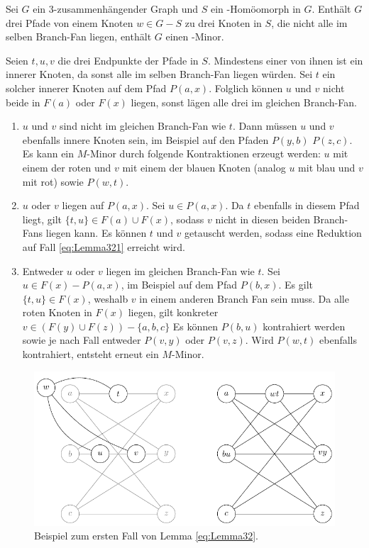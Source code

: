\begin{lemma}\label{eq:Lemma32}
  Sei $G$ ein $3$-zusammenhängender Graph und $S$ ein \kdd-Homöomorph in $G$.
  Enthält $G$ drei Pfade von einem Knoten $w \in G - S$ zu drei Knoten in $S$, die nicht alle im selben Branch-Fan liegen, enthält $G$ einen \kf-Minor.
\end{lemma}
\begin{beweis}
  Seien $t, u, v$ die drei Endpunkte der Pfade in $S$.
  Mindestens einer von ihnen ist ein innerer Knoten, da sonst alle im selben Branch-Fan liegen würden.
  Sei \oBdA $t$ ein solcher innerer Knoten auf dem Pfad $P(a, x)$.
  Folglich können $u$ und $v$ nicht beide in $F(a)$ oder $F(x)$ liegen, sonst lägen alle drei im gleichen Branch-Fan.
  \begin{enumerate}
    \item $u$ und $v$ sind nicht im gleichen Branch-Fan wie $t$. \label{eq:Lemma321}
          Dann müssen $u$ und $v$ ebenfalls innere Knoten sein, im Beispiel auf den Pfaden $P(y, b)$ \bzw $P(z, c)$.
          Es kann ein $M$-Minor durch folgende Kontraktionen erzeugt werden: $u$ mit einem der roten und $v$ mit einem der blauen Knoten (analog $u$ mit blau und $v$ mit rot) sowie $P(w, t)$.
    \item $u$ oder $v$ liegen auf $P(a, x)$. \label{eq:Lemma322}
          Sei \oBdA $u \in P(a, x)$.
          Da $t$ ebenfalls in diesem Pfad liegt, gilt $\{t, u\} \in F(a) \cup F(x)$, sodass $v$ nicht in diesen beiden Branch-Fans liegen kann.
          Es können $t$ und $v$ getauscht werden, sodass eine Reduktion auf Fall \ref{eq:Lemma321} erreicht wird.
    \item Entweder $u$ oder $v$ liegen im gleichen Branch-Fan wie $t$. \label{eq:Lemma323}
          Sei \oBdA $u \in F(x) - P(a, x)$, im Beispiel auf dem Pfad $P(b, x)$.
          Es gilt $\{t, u\} \in F(x)$, weshalb $v$ in einem anderen Branch Fan sein muss.
          Da alle roten Knoten in $F(x)$ liegen, gilt konkreter $v \in (F(y) \cup F(z)) - \{a, b, c\}$
          Es können $P(b, u)$ kontrahiert werden sowie je nach Fall entweder $P(v, y)$ oder $P(v, z)$.
          Wird $P(w, t)$ ebenfalls kontrahiert, entsteht erneut ein $M$-Minor.
  \end{enumerate}
\end{beweis}
\begin{figure}[H]
  \centering
  \includegraphics[keepaspectratio]{bilder/Lemma321.pdf}
  \caption{Beispiel zum ersten Fall von Lemma \ref{eq:Lemma32}.}
  \label{fig:Lemma321}
\end{figure}
